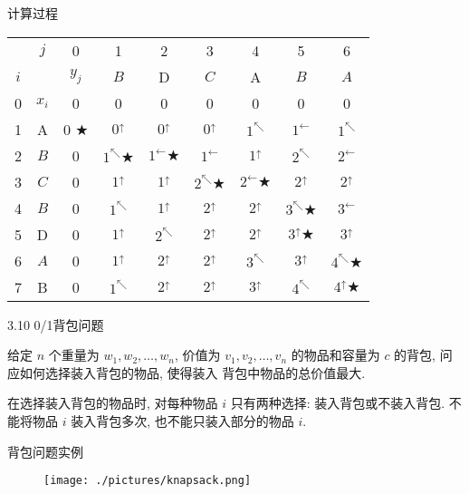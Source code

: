 \documentclass[fontset=fandol,UTF8,fleqn]{beamer}
\begin{document}
\begin{frame}{计算过程}
\begin{table}
  \centering
\begin{tabular}{cc|c|c|c|c|c|c|c|}
& $j$ & 0 & 1 & 2 & 3 & 4 & 5 & 6\\ 
$i$  &    & $y_j$ & ${B}$ & D & ${C}$ & A & ${B}$ & ${A}$ \\
\hline
 0 & $x_i$ & 0 & 0 & 0 & 0 & 0 & 0 & 0 \\ \hline
1 & A     & 0 $\bigstar$ & $0^\uparrow$ & $0^\uparrow$ & $0^\uparrow$ & $1^\nwarrow$ & $1^\gets$ & $1^\nwarrow$   \\ \hline
2 & ${B}$ & 0 & $1^\nwarrow\bigstar$ & $1^\gets\bigstar$ & $1^\gets$ & $1^\uparrow$ & $2^\nwarrow$ & $2^\gets$  \\ \hline
3 & ${C}$ & 0 & $1^\uparrow$ & $1^\uparrow$ & $2^\nwarrow\bigstar$ & $2^\gets\bigstar$ & $2^\uparrow$ &  $2^\uparrow$ \\\hline
4 & ${B}$ & 0 & $1^\nwarrow$ & $1^\uparrow$ & $2^\uparrow$ & $2^\uparrow$ & $3^\nwarrow\bigstar$ & $3^\gets$ \\\hline
5 & D & 0 & $1^\uparrow$ & $2^\nwarrow$ & $2^\uparrow$ & $2^\uparrow$ & $3^\uparrow\bigstar$ & $3^\uparrow$  \\\hline
6 & ${A}$ & 0 & $1^\uparrow$ & $2^\uparrow$ & $2^\uparrow$ & $3^\nwarrow$ & $3^\uparrow$ &  $4^\nwarrow\bigstar$ \\\hline
7 & B & 0 & $1^\nwarrow$ & $2^\uparrow$ & $2^\uparrow$ & $3^\uparrow$ & $4^\nwarrow$ & $4^\uparrow\bigstar$ \\
\hline
  \end{tabular}
\end{table}
\end{frame}

\begin{frame}{3.10 0/1背包问题}
\begin{definition}
 给定 $n$ 个重量为 $w_1, w_2, \ldots, w_n$, 价值为 $v_1,v_2, \ldots,
 v_n$ 的物品和容量为 $c$ 的背包, 问应如何选择装入背包的物品, 使得装入
 背包中物品的{总价值最大}.
\end{definition} \pause
\begin{definition}[0-1 背包问题]
  在选择装入背包的物品时, 对每种物品 $i$ 只有两种选择: 装入背包或不装入背包. 不能将物品 $i$ 装入背包多次, 也不能只装入部分的物品 $i$.   
\end{definition}
\end{frame}

\begin{frame}{背包问题实例}
\begin{figure}[centering]
  \centering
  \texttt{[image: ./pictures/knapsack.png]}
\end{figure}
\end{frame}
\end{document}

